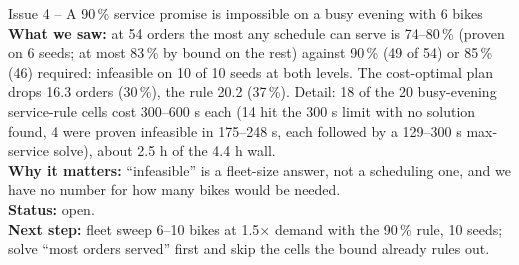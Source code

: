 \begin{issuebox}{Issue 4 -- A 90\,\% service promise is impossible on a busy evening with 6 bikes}
\textbf{What we saw:} at 54 orders the most any schedule can serve is 74--80\,\% (proven on 6 seeds; at most 83\,\% by bound on the rest) against 90\,\% (49 of 54) or 85\,\% (46) required: infeasible on 10 of 10 seeds at both levels. The cost-optimal plan drops 16.3 orders (30\,\%), the rule 20.2 (37\,\%). Detail: 18 of the 20 busy-evening service-rule cells cost 300--600 s each (14 hit the 300 s limit with no solution found, 4 were proven infeasible in 175--248 s, each followed by a 129--300 s max-service solve), about 2.5 h of the 4.4 h wall.\\
\textbf{Why it matters:} ``infeasible'' is a fleet-size answer, not a scheduling one, and we have no number for how many bikes would be needed.\\
\textbf{Status:} open.\\
\textbf{Next step:} fleet sweep 6--10 bikes at 1.5$\times$ demand with the 90\,\% rule, 10 seeds; solve ``most orders served'' first and skip the cells the bound already rules out.
\end{issuebox}

